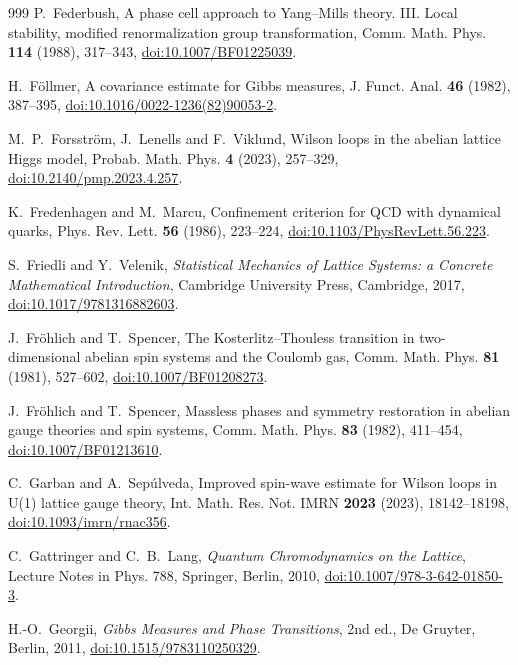 \documentclass[aps,prd,twocolumn,superscriptaddress,nofootinbib,longbibliography,floatfix,amsmath,amssymb,10pt]{revtex4-2}
\theoremstyle{definition}
\theoremstyle{remark}
\begin{document}
\begin{thebibliography}{999}
P.~Federbush, A phase cell approach to Yang--Mills theory. III. Local
stability, modified renormalization group transformation, Comm. Math. Phys.
\textbf{114} (1988), 317--343,
\href{https://doi.org/10.1007/BF01225039}{doi:10.1007/BF01225039}.

H.~F\"ollmer, A covariance estimate for Gibbs measures, J. Funct. Anal.
\textbf{46} (1982), 387--395,
\href{https://doi.org/10.1016/0022-1236(82)90053-2}{doi:10.1016/0022-1236(82)90053-2}.

M.~P.~Forsstr\"om, J.~Lenells and F.~Viklund, Wilson loops in the abelian
lattice Higgs model, Probab. Math. Phys. \textbf{4} (2023), 257--329,
\href{https://doi.org/10.2140/pmp.2023.4.257}{doi:10.2140/pmp.2023.4.257}.

K.~Fredenhagen and M.~Marcu, Confinement criterion for QCD with dynamical
quarks, Phys. Rev. Lett. \textbf{56} (1986), 223--224,
\href{https://doi.org/10.1103/PhysRevLett.56.223}{doi:10.1103/PhysRevLett.56.223}.

S.~Friedli and Y.~Velenik, \emph{Statistical Mechanics of Lattice Systems: a
Concrete Mathematical Introduction}, Cambridge University Press, Cambridge,
2017, \href{https://doi.org/10.1017/9781316882603}{doi:10.1017/9781316882603}.

J.~Fr\"ohlich and T.~Spencer, The Kosterlitz--Thouless transition in
two-dimensional abelian spin systems and the Coulomb gas, Comm. Math. Phys.
\textbf{81} (1981), 527--602,
\href{https://doi.org/10.1007/BF01208273}{doi:10.1007/BF01208273}.

J.~Fr\"ohlich and T.~Spencer, Massless phases and symmetry restoration in
abelian gauge theories and spin systems, Comm. Math. Phys. \textbf{83} (1982),
411--454, \href{https://doi.org/10.1007/BF01213610}{doi:10.1007/BF01213610}.

C.~Garban and A.~Sep\'ulveda, Improved spin-wave estimate for Wilson loops
in U(1) lattice gauge theory, Int. Math. Res. Not. IMRN \textbf{2023}
(2023), 18142--18198,
\href{https://doi.org/10.1093/imrn/rnac356}{doi:10.1093/imrn/rnac356}.

C.~Gattringer and C.~B.~Lang, \emph{Quantum Chromodynamics on the Lattice},
Lecture Notes in Phys. 788, Springer, Berlin, 2010,
\href{https://doi.org/10.1007/978-3-642-01850-3}{doi:10.1007/978-3-642-01850-3}.

H.-O.~Georgii, \emph{Gibbs Measures and Phase Transitions}, 2nd ed., De
Gruyter, Berlin, 2011,
\href{https://doi.org/10.1515/9783110250329}{doi:10.1515/9783110250329}.


\end{thebibliography}
\end{document}
